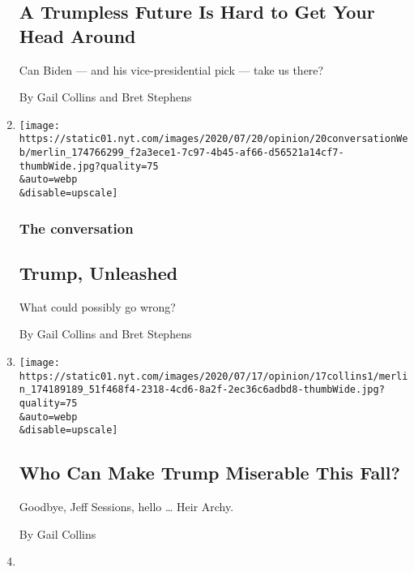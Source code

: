 \begin{enumerate}
  \hypertarget{a-trumpless-future-is-hard-to-get-your-head-around}{%
  \subsection{A Trumpless Future Is Hard to Get Your Head
  Around}\label{a-trumpless-future-is-hard-to-get-your-head-around}}

  Can Biden --- and his vice-presidential pick --- take us there?

  By Gail Collins and Bret Stephens
\item
  \href{/2020/07/21/opinion/trump-portland-coronavirus.html}{}

  \texttt{[image: https://static01.nyt.com/images/2020/07/20/opinion/20conversationWeb/merlin\_174766299\_f2a3ece1-7c97-4b45-af66-d56521a14cf7-thumbWide.jpg?quality=75\\\&auto=webp\\\&disable=upscale]}

  \hypertarget{the-conversation-2}{%
  \subsubsection{The conversation}\label{the-conversation-2}}

  \hypertarget{trump-unleashed}{%
  \subsection{Trump, Unleashed}\label{trump-unleashed}}

  What could possibly go wrong?

  By Gail Collins and Bret Stephens
\item
  \href{/2020/07/15/opinion/trump-sessions-senate.html}{}

  \texttt{[image: https://static01.nyt.com/images/2020/07/17/opinion/17collins1/merlin\_174189189\_51f468f4-2318-4cd6-8a2f-2ec36c6adbd8-thumbWide.jpg?quality=75\\\&auto=webp\\\&disable=upscale]}

  \hypertarget{who-can-make-trump-miserable-this-fall}{%
  \subsection{Who Can Make Trump Miserable This
  Fall?}\label{who-can-make-trump-miserable-this-fall}}

  Goodbye, Jeff Sessions, hello \ldots{} Heir Archy.

  By Gail Collins
\item
  \href{/2020/07/08/opinion/birth-control-supreme-court.html}{}


\end{enumerate}
